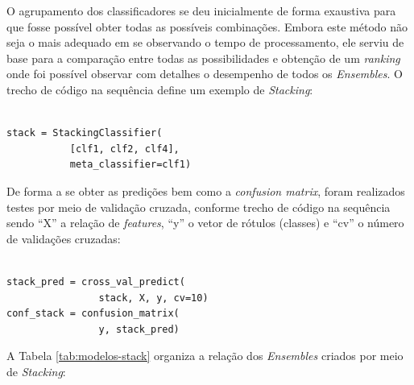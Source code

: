 O agrupamento dos classificadores se deu inicialmente de forma exaustiva para que fosse possível obter todas as possíveis combinações. Embora este método não seja o mais adequado em se observando o tempo de processamento, ele serviu de base para a comparação entre todas as possibilidades e obtenção de um \textit{ranking} onde foi possível observar com detalhes o desempenho de todos os \textit{Ensembles}. O trecho de código na sequência define um exemplo de \textit{Stacking}:

\begin{verbatim}

stack = StackingClassifier(
           [clf1, clf2, clf4],
           meta_classifier=clf1)
\end{verbatim}

De forma a se obter as predições bem como a \textit{confusion matrix}, foram realizados testes por meio de validação cruzada, conforme trecho de código na sequência sendo ``X'' a relação de \textit{features}, ``y'' o vetor de rótulos (classes) e ``cv'' o número de validações cruzadas:

\begin{verbatim}

stack_pred = cross_val_predict(
                stack, X, y, cv=10)
conf_stack = confusion_matrix(
                y, stack_pred)
\end{verbatim}

   
   
   
   
   
   
   
   
   
   
   
   
   
   
   
A Tabela \ref{tab:modelos-stack} organiza a relação dos \textit{Ensembles} criados por meio de \textit{Stacking}:

